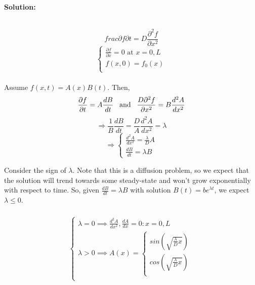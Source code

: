 {\color{red} {\bf Solution:}

\\
\begin{equation}
    frac{\partial f}{\partial t} = D \frac{\partial^2 f}{\partial x^2} 
\end{equation} 
\begin{equation}
    \begin{cases}
        \frac{\partial{f}}{\partial{x}} = 0 \text{  at  }x=0,L \\
        f (x,0) =  f_0(x)\\
    \end{cases}
\end{equation}
\\

Assume $f(x,t)=A(x)B(t)$. Then, 
\begin{equation}
    \frac{\partial f}{\partial t}=A\frac{dB}{dt} \textrm{\;\;\;and\;\;\;} \frac{D\partial^2f}{\partial x^2}=B\frac{d^2A}{dx^2}
\end{equation}
\begin{equation}
    \Rightarrow \frac{1}{B}\frac{dB}{dt}=\frac{D}{A}\frac{d^2A}{dx^2} = \lambda
\end{equation}
\begin{equation}
    \Rightarrow \begin{cases}
        \frac{d^2 A}{dx^2}=\frac{\lambda}{D} A \\
        \frac{dB}{dt}=\lambda B  
    \end{cases}
\end{equation}

Consider the sign of $\lambda$. Note that this is a diffusion problem, so we expect that the solution will trend towards some steady-state and won't grow exponentially with respect to time. So, given $\frac{dB}{dt}=\lambda B$ with solution $B(t)=be^{\lambda t}$, we expect $\lambda \leq 0$. \\ \\


        \begin{gather*}
        \begin{cases}
        \lambda = 0 \implies \frac{d^2A}{dx^2}, \frac{dA}{dx} = 0 : x = 0,L \\
        \lambda > 0 \implies A(x) = \begin{cases} sin(\sqrt{\frac{\lambda}{D}x}) \\  cos(\sqrt{\frac{\lambda}{D}x}) \\ \end{cases} \\
        \end{cases}
        \end{gather*}
        
}
